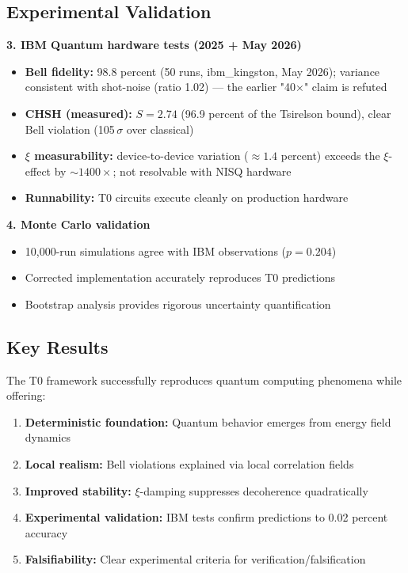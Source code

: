 \subsection{Experimental Validation}

\textbf{3. IBM Quantum hardware tests (2025 + May 2026)}
\begin{itemize}
	\item \textbf{Bell fidelity:} 98.8 percent (50 runs, ibm\_kingston, May 2026); variance consistent with shot-noise (ratio 1.02) --- the earlier "40×" claim is refuted
	\item \textbf{CHSH (measured):} $S = 2.74$ (96.9 percent of the Tsirelson bound), clear Bell violation (105\,$\sigma$ over classical)
	\item \textbf{$\xi$ measurability:} device-to-device variation ($\approx 1.4$ percent) exceeds the $\xi$-effect by $\sim 1400\times$; not resolvable with NISQ hardware
	\item \textbf{Runnability:} T0 circuits execute cleanly on production hardware
\end{itemize}

\textbf{4. Monte Carlo validation}
\begin{itemize}
	\item 10,000-run simulations agree with IBM observations ($p = 0.204$)
	\item Corrected implementation accurately reproduces T0 predictions
	\item Bootstrap analysis provides rigorous uncertainty quantification
\end{itemize}

\subsection{Key Results}

\begin{keyresult}
	The T0 framework successfully reproduces quantum computing phenomena while offering:
	\begin{enumerate}
		\item \textbf{Deterministic foundation:} Quantum behavior emerges from energy field dynamics
		\item \textbf{Local realism:} Bell violations explained via local correlation fields
		\item \textbf{Improved stability:} $\xi$-damping suppresses decoherence quadratically
		\item \textbf{Experimental validation:} IBM tests confirm predictions to 0.02 percent accuracy
		\item \textbf{Falsifiability:} Clear experimental criteria for verification/falsification
	\end{enumerate}
\end{keyresult}

